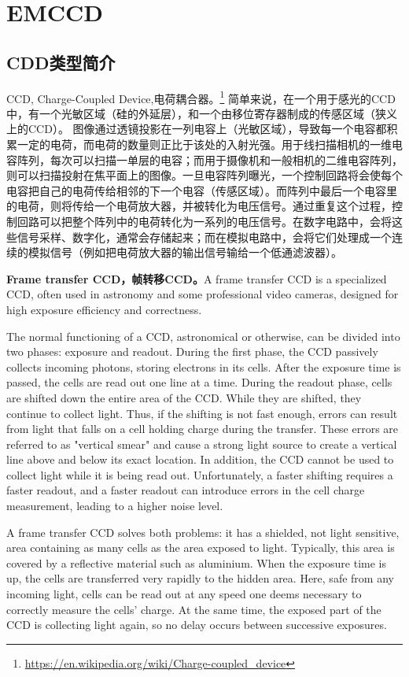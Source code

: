 \section{EMCCD}
\subsection{CDD类型简介}
CCD, Charge-Coupled Device,电荷耦合器。\footnote{\url{https://en.wikipedia.org/wiki/Charge-coupled_device}}
简单来说，在一个用于感光的CCD中，有一个光敏区域（硅的外延层），和一个由移位寄存器制成的传感区域（狭义上的CCD）。
图像通过透镜投影在一列电容上（光敏区域），导致每一个电容都积累一定的电荷，而电荷的数量则正比于该处的入射光强。用于线扫描相机的一维电容阵列，每次可以扫描一单层的电容；而用于摄像机和一般相机的二维电容阵列，则可以扫描投射在焦平面上的图像。一旦电容阵列曝光，一个控制回路将会使每个电容把自己的电荷传给相邻的下一个电容（传感区域）。而阵列中最后一个电容里的电荷，则将传给一个电荷放大器，并被转化为电压信号。通过重复这个过程，控制回路可以把整个阵列中的电荷转化为一系列的电压信号。在数字电路中，会将这些信号采样、数字化，通常会存储起来；而在模拟电路中，会将它们处理成一个连续的模拟信号（例如把电荷放大器的输出信号输给一个低通滤波器）。

\textbf{Frame transfer CCD，帧转移CCD。}A frame transfer CCD is a specialized CCD, often used in astronomy and some professional video cameras, designed for high exposure efficiency and correctness.

The normal functioning of a CCD, astronomical or otherwise, can be divided into two phases: exposure and readout. During the first phase, the CCD passively collects incoming photons, storing electrons in its cells. After the exposure time is passed, the cells are read out one line at a time. During the readout phase, cells are shifted down the entire area of the CCD. While they are shifted, they continue to collect light. Thus, if the shifting is not fast enough, errors can result from light that falls on a cell holding charge during the transfer. These errors are referred to as "vertical smear" and cause a strong light source to create a vertical line above and below its exact location. In addition, the CCD cannot be used to collect light while it is being read out. Unfortunately, a faster shifting requires a faster readout, and a faster readout can introduce errors in the cell charge measurement, leading to a higher noise level.

A frame transfer CCD solves both problems: it has a shielded, not light sensitive, area containing as many cells as the area exposed to light. Typically, this area is covered by a reflective material such as aluminium. When the exposure time is up, the cells are transferred very rapidly to the hidden area. Here, safe from any incoming light, cells can be read out at any speed one deems necessary to correctly measure the cells' charge. At the same time, the exposed part of the CCD is collecting light again, so no delay occurs between successive exposures.

